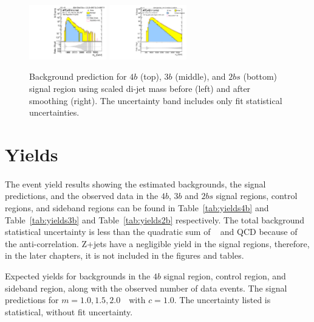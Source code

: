 \begin{figure}[htb!]
\begin{center}
\includegraphics[width=0.3\textwidth,angle=-90]{figures/boosted/Signal/b77_TwoTag_split_Signal_mHH_pole_1_blind.pdf}
\includegraphics[width=0.3\textwidth,angle=-90]{figures/boosted/Smooth/Moriond_bkg_9_TwoTag_split_pole_Signal_mHH_pole_1_blind.pdf}
\end{center}
\caption{Background prediction for $4b$ (top), $3b$ (middle), and $2bs$ (bottom) signal region using scaled di-jet mass before (left) and after smoothing (right). The uncertainty band includes only fit statistical uncertainties.}
\label{fig:signal-region-mjjscaled-smooth-bkg-noSYS}
\end{figure}

\section{Yields}
\label{sec:yields}
\paragraph{}
The event yield results showing the estimated backgrounds, the signal predictions, and the observed data in the $4b$, $3b$ and $2bs$ signal regions, control regions, and sideband regions can be found in Table~\ref{tab:yields4b} and Table~\ref{tab:yields3b} and Table~\ref{tab:yields2b} respectively. 
The total background statistical uncertainty is less than the quadratic sum of \ttbar~ and QCD because of the anti-correlation.
Z+jets have a negligible yield in the signal regions, therefore, in the later chapters, it is not included in the figures and tables.

\begin{table}[htb!]
\footnotesize
\begin{center}
\caption{Expected yields for backgrounds in the $4b$ signal region, control region, and sideband region, along with the observed number of data events.  The signal predictions for \Grav $m=1.0, 1.5, 2.0$~\TeV\ with $c=1.0$. The uncertainty listed is statistical, without fit uncertainty.}

\label{tab:yields4b}
\end{center}
\end{table}


